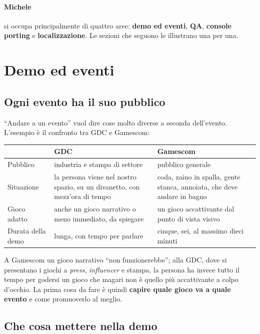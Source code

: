 \paragraph{Michele} si occupa principalmente di quattro aree: \textbf{demo ed
eventi}, \textbf{QA}, \textbf{console porting} e \textbf{localizzazione}. Le
sezioni che seguono le illustrano una per una.

\section{Demo ed eventi}
\label{sec:z4-eventi}

\subsection{Ogni evento ha il suo pubblico}

``Andare a un evento'' vuol dire cose molto diverse a seconda dell'evento.
L'esempio è il confronto tra GDC e Gamescom:
\begin{center}
  \begin{tabular}{@{}p{}p{}p{}@{}}
    \toprule
     & \textbf{GDC} & \textbf{Gamescom} \\
    \midrule
    Pubblico & industria e stampa di settore & pubblico generale \\
    Situazione & la persona viene nel nostro spazio, su un divanetto, con
    mezz'ora di tempo & coda, zaino in spalla, gente stanca, annoiata, che
    deve andare in bagno \\
    Gioco adatto & anche un gioco narrativo o meno immediato, da spiegare &
    un gioco accattivante dal punto di vista visivo \\
    Durata della demo & lunga, con tempo per parlare & cinque, sei, al massimo
    dieci minuti \\
    \bottomrule
  \end{tabular}
\end{center}
A Gamescom un gioco narrativo ``non funzionerebbe''; alla GDC, dove si
presentano i giochi a \emph{press}, \emph{influencer} e stampa, la persona ha
invece tutto il tempo per godersi un gioco che magari non è quello più
accattivante a colpo d'occhio. La prima cosa da fare è quindi \textbf{capire
quale gioco va a quale evento} e come promuoverlo al meglio.

\subsection{Che cosa mettere nella demo}

